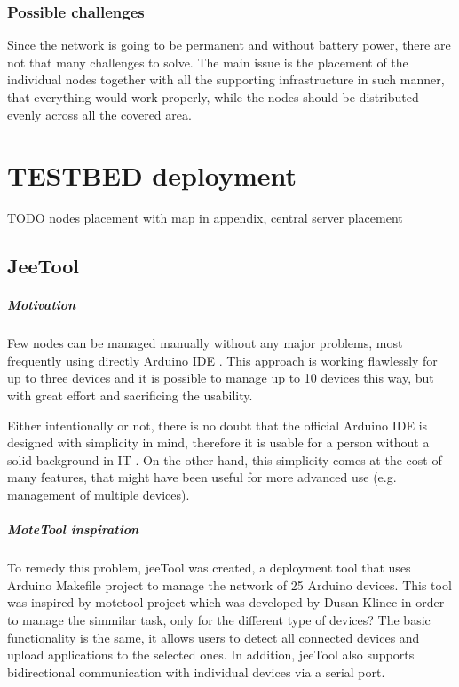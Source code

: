 \documentclass[
  print, %
  table,   %
  nolof,     %
  nolot,     %
           oneside
]{fithesis3}
\begin{document}
  \subsection{Possible challenges}
  Since the network is going to be permanent and without battery power, there are not that many challenges to solve. The main issue is the placement of the individual nodes together with all the supporting infrastructure in such manner, that everything would work properly, while the nodes should be distributed evenly across all the covered area.



\chapter{TESTBED deployment}
TODO nodes placement with map in appendix, central server placement

  \section{JeeTool} %
\paragraph{Motivation}
  Few nodes can be managed manually without any major problems, most frequently using directly Arduino IDE \cite{Arduino}.
  This approach is working flawlessly for up to three devices and it is possible to manage up to 10 devices this way, but with great effort and sacrificing the usability.

  Either intentionally or not, there is no doubt that the official Arduino IDE is designed with simplicity in mind, therefore it is usable for a person without a solid background in IT \cite{ArduinoIntro}.
  On the other hand, this simplicity comes at the cost of many features, that might have been useful for more advanced use (e.g. management of multiple devices).

\paragraph{MoteTool inspiration}
  To remedy this problem, jeeTool \cite{JeeTool}
  was created, a deployment tool that uses Arduino Makefile project \cite{ArduinoMK}
  to manage the network of 25 Arduino devices. This tool was inspired by motetool project \cite{motetool}
  which was developed by Dusan Klinec in order to manage the simmilar task, only for the different type of devices? The basic functionality is the same, it allows users to detect all connected devices and upload applications to the selected ones. In addition, jeeTool also supports bidirectional communication with individual devices via a serial port.
\end{document}
